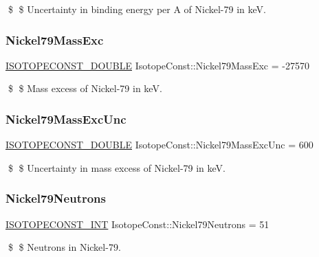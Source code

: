 \$ \$ Uncertainty in binding energy per A of Nickel-\/79 in keV. \mbox{\label{group___isotope_const-_nickel-_ni79_ga689573b580f13597da714f3695cffd9c}} 
\subsubsection{\texorpdfstring{Nickel79\+Mass\+Exc}{Nickel79MassExc}}
{\footnotesize\ttfamily \mbox{\hyperlink{group___isotope_const-_macros_ga8f45a7272ce02c0b4c65c44636ed719a}{I\+S\+O\+T\+O\+P\+E\+C\+O\+N\+S\+T\+\_\+\+D\+O\+U\+B\+LE}} Isotope\+Const\+::\+Nickel79\+Mass\+Exc = -\/27570}

\$ \$ Mass excess of Nickel-\/79 in keV. \mbox{\label{group___isotope_const-_nickel-_ni79_ga72756fa7e96f1d1b6a4fae06a1accbfb}} 
\subsubsection{\texorpdfstring{Nickel79\+Mass\+Exc\+Unc}{Nickel79MassExcUnc}}
{\footnotesize\ttfamily \mbox{\hyperlink{group___isotope_const-_macros_ga8f45a7272ce02c0b4c65c44636ed719a}{I\+S\+O\+T\+O\+P\+E\+C\+O\+N\+S\+T\+\_\+\+D\+O\+U\+B\+LE}} Isotope\+Const\+::\+Nickel79\+Mass\+Exc\+Unc = 600}

\$ \$ Uncertainty in mass excess of Nickel-\/79 in keV. \mbox{\label{group___isotope_const-_nickel-_ni79_ga08a7a2b9b533fa54c5caa9d6f9aac6a9}} 
\subsubsection{\texorpdfstring{Nickel79\+Neutrons}{Nickel79Neutrons}}
{\footnotesize\ttfamily \mbox{\hyperlink{group___isotope_const-_macros_ga5f18360b3e99483a35c32d789e62621c}{I\+S\+O\+T\+O\+P\+E\+C\+O\+N\+S\+T\+\_\+\+I\+NT}} Isotope\+Const\+::\+Nickel79\+Neutrons = 51}

\$ \$ Neutrons in Nickel-\/79. \mbox{\label{group___isotope_const-_nickel-_ni79_ga3c2b76fcb18fcd03ce7b18383c561209}} 
